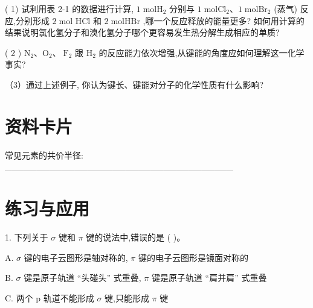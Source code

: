 \documentclass[10pt]{article}
\begin{document}
( 1) 试利用表 2-1 的数据进行计算, \(1\mathrm{\;{mol}}{\mathrm{H}}_{2}\) 分别与 \(1\mathrm{\;{mol}}{\mathrm{{Cl}}}_{2}\text{、}1\mathrm{\;{mol}}{\mathrm{{Br}}}_{2}\) (蒸气) 反应,分别形成 \(2\mathrm{\;{mol}}\) \(\mathrm{{HCl}}\) 和 \(2\mathrm{\;{mol}}\mathrm{{HBr}}\) ,哪一个反应释放的能量更多? 如何用计算的结果说明氯化氢分子和溴化氢分子哪个更容易发生热分解生成相应的单质?

( 2 ) \({\mathrm{N}}_{2}\text{、}{\mathrm{O}}_{2}\text{、}{\mathrm{\;F}}_{2}\) 跟 \({\mathrm{H}}_{2}\) 的反应能力依次增强,从键能的角度应如何理解这一化学事实?

（3）通过上述例子, 你认为键长、键能对分子的化学性质有什么影响?


\section*{资料卡片}

常见元素的共价半径: \_\_\_\_\_\_\_\_\_\_\_\_\_\_\_\_\_\_\_\_\_\_\_\_\_\_\_\_\_\_\_\_\_\_\_\_

\begin{center}
\end{center}

\section*{练习与应用}

1. 下列关于 \(\sigma\) 键和 \(\pi\) 键的说法中,错误的是 ( )。

A. \(\sigma\) 键的电子云图形是轴对称的, \(\pi\) 键的电子云图形是镜面对称的

B. \(\sigma\) 键是原子轨道 “头碰头” 式重叠, \(\pi\) 键是原子轨道 “肩并肩” 式重叠

C. 两个 \(\mathrm{p}\) 轨道不能形成 \(\sigma\) 键,只能形成 \(\pi\) 键
\end{document}
